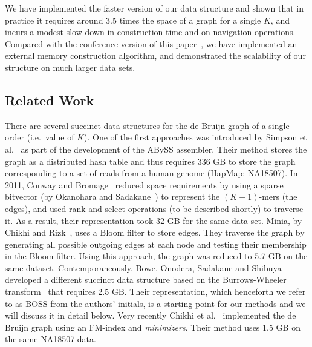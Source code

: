 We have implemented the faster version of our data structure and shown that in practice
it requires around $3.5$ times the space of a graph for a single $K$, and incurs a
modest slow down in construction time and on navigation operations. Compared
with the conference version of this paper~\cite{varorder-dcc}, we have implemented an
external memory construction algorithm, and demonstrated the scalability of our
structure on much larger data sets.


\subsection{Related Work} There are several succinct data structures for the de
Bruijn graph of a single order (i.e.~value of $K$).  One of the first approaches
was introduced by Simpson et al.~\cite{Simpson:2009} as part of the development
of the ABySS assembler.  Their method stores the graph as a distributed hash
table and thus requires 336 GB to store the graph corresponding to a set of
reads from a human genome (HapMap: NA18507).  In 2011, Conway and
Bromage~\cite{conway} reduced space requirements by using a sparse bitvector (by
Okanohara and Sadakane~\cite{bitvector}) to represent the $(K + 1)$-mers (the
edges), and used rank and select operations (to be described shortly) to
traverse it. As a result, their representation took 32 GB for the same data set.
Minia, by Chikhi and Rizk~\cite{wabi}, uses a Bloom filter to store edges.
They traverse the graph by generating all possible outgoing edges at each node
and testing their membership in the Bloom filter. Using this approach, the graph
was reduced to 5.7 GB on the same dataset.  Contemporaneously, Bowe, Onodera,
Sadakane and Shibuya~\cite{bowe} developed a different succinct data structure
based on the Burrows-Wheeler transform~\cite{bw1994} that requires 2.5 GB.
Their representation, which henceforth we refer to as BOSS from the authors'
initials, is a starting point for our methods and we will discuss it in detail
below.  Very recently Chikhi {et al.}~\cite{paul} implemented the de Bruijn
graph using an FM-index and {\em minimizers}.  Their method uses 1.5 GB on the
same NA18507 data.  

